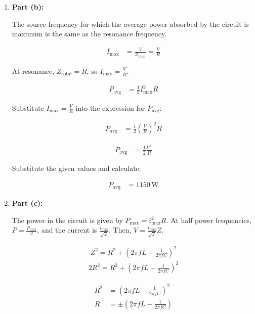 \documentclass[journal,12pt,twocolumn]{IEEEtran}
\theoremstyle{remark}
\begin{document}
\begin{enumerate}
    \item \textbf{Part (b):}

    The source frequency for which the average power absorbed by the circuit is maximum is the same as the resonance frequency.

    \begin{align}
        I_{\text{max}} &= \frac{V}{Z_{\text{total}}} = \frac{V}{R}
    \end{align}

    At resonance, \(Z_{\text{total}} = R\), so \(I_{\text{max}} = \frac{V}{R}\).

    \begin{align}
        P_{\text{avg}} &= \frac{1}{2} I_{\text{max}}^2 R
    \end{align}

    Substitute \(I_{\text{max}} = \frac{V}{R}\) into the expression for \(P_{\text{avg}}\):

    \begin{align}
        P_{\text{avg}} &= \frac{1}{2} \left(\frac{V}{R}\right)^2 R
    \end{align}

    \begin{align}
        P_{\text{avg}} &= \frac{1}{2} \frac{V^2}{R} \label{eq:9}
    \end{align}

    Substitute the given values and calculate:

    \begin{align}
        P_{\text{avg}} &= 1150 \, \text{W}
    \end{align}

    \item \textbf{Part (c):}

    The power in the circuit is given by \(P_{\text{max}} = i_{\text{max}}^2 R\). At half power frequencies, \(P = \frac{P_{\text{max}}}{2}\), and the current is \(\frac{i_{\text{max}}}{\sqrt{2}}\). Then, \(V = \frac{i_{\text{max}}}{\sqrt{2}} Z\).

\begin{align}
Z^2 = R^2 + \left(2\pi f L - \frac{1}{2\pi f C}\right)^2
\end{align}
\begin{align}
2R^2=  R^2 + \left(2\pi f L - \frac{1}{2\pi f C}\right)^2
\end{align}

    \begin{align}
        R^2 &= \left(2\pi f L - \frac{1}{2\pi f C}\right)^2 \\
        R &= \pm \left(2\pi f L - \frac{1}{2\pi f C}\right)
    \end{align}


\end{enumerate}
\end{document}
